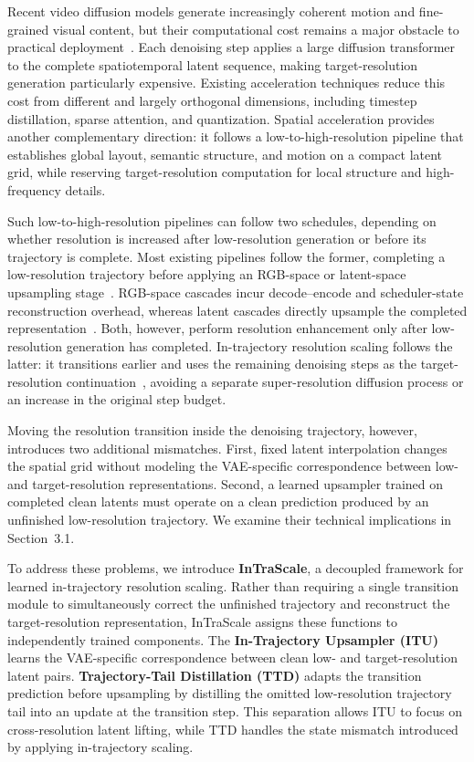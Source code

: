 \documentclass[letterpaper]{article} %
\begin{document}
Recent video diffusion models generate increasingly coherent motion and
fine-grained visual content, but their computational cost remains a major
obstacle to practical deployment~\citep{wan2025}. Each denoising step
applies a large diffusion transformer to the complete spatiotemporal latent
sequence, making target-resolution generation particularly expensive.
Existing acceleration techniques reduce this cost from different and largely
orthogonal dimensions, including timestep distillation, sparse attention, and
quantization. Spatial acceleration provides another complementary direction:
it follows a low-to-high-resolution pipeline that establishes global layout,
semantic structure, and motion on a compact latent grid, while reserving
target-resolution computation for local structure and high-frequency details.

Such low-to-high-resolution pipelines can follow two schedules, depending on whether
resolution is increased after low-resolution generation or before its
trajectory is complete. Most existing pipelines follow the former, completing
a low-resolution trajectory before applying an RGB-space or latent-space
upsampling stage~\citep{ho2022imagenvideo,blattmann2023videoldm,
  wang2023lavie}. RGB-space cascades incur decode--encode and scheduler-state
  reconstruction overhead, whereas latent cascades directly upsample the completed
representation~\citep{xie2025simplegvr,zhao2026luve}. Both, however, perform
resolution enhancement only after low-resolution generation has completed. In-trajectory
resolution scaling follows the latter: it transitions earlier and uses the
remaining denoising steps as the target-resolution
continuation~\citep{jeong2025ralu,lightx2v2026}, avoiding a separate
super-resolution diffusion process or an increase in the original step
budget.

Moving the resolution transition inside the denoising trajectory,
however, introduces two additional mismatches. First, fixed latent
interpolation changes the spatial grid without modeling the
VAE-specific correspondence between low- and target-resolution
representations. Second, a learned upsampler trained on completed clean
latents must operate on a clean prediction produced by an unfinished
low-resolution trajectory. We examine their technical implications in
Section~3.1.

To address these problems, we introduce \textbf{InTraScale}, a
decoupled framework for learned in-trajectory resolution scaling.
Rather than requiring a single transition module to simultaneously
correct the unfinished trajectory and reconstruct the
target-resolution representation, InTraScale assigns these functions
to independently trained components. The \textbf{In-Trajectory
Upsampler (ITU)} learns the VAE-specific correspondence between
clean low- and target-resolution latent pairs.
\textbf{Trajectory-Tail Distillation (TTD)} adapts the transition
prediction before upsampling by distilling the omitted
low-resolution trajectory tail into an update at the transition step. This
separation allows ITU to focus on cross-resolution latent lifting,
while TTD handles the state mismatch introduced by applying in-trajectory scaling.
\end{document}
